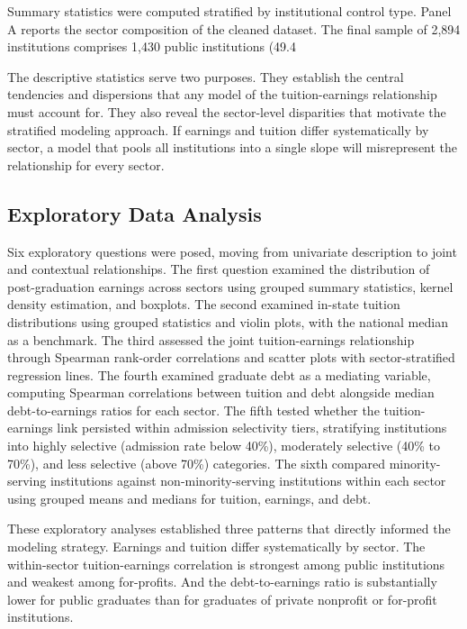 Summary statistics were computed stratified by institutional control type. Panel A reports the sector composition of the cleaned dataset. The final sample of 2,894 institutions comprises 1,430 public institutions (49.4%

The descriptive statistics serve two purposes. They establish the central tendencies and dispersions that any model of the tuition-earnings relationship must account for. They also reveal the sector-level disparities that motivate the stratified modeling approach. If earnings and tuition differ systematically by sector, a model that pools all institutions into a single slope will misrepresent the relationship for every sector.

\subsection{Exploratory Data Analysis}

Six exploratory questions were posed, moving from univariate description to joint and contextual relationships. The first question examined the distribution of post-graduation earnings across sectors using grouped summary statistics, kernel density estimation, and boxplots. The second examined in-state tuition distributions using grouped statistics and violin plots, with the national median as a benchmark. The third assessed the joint tuition-earnings relationship through Spearman rank-order correlations and scatter plots with sector-stratified regression lines. The fourth examined graduate debt as a mediating variable, computing Spearman correlations between tuition and debt alongside median debt-to-earnings ratios for each sector. The fifth tested whether the tuition-earnings link persisted within admission selectivity tiers, stratifying institutions into highly selective (admission rate below 40\%), moderately selective (40\% to 70\%), and less selective (above 70\%) categories. The sixth compared minority-serving institutions against non-minority-serving institutions within each sector using grouped means and medians for tuition, earnings, and debt.

These exploratory analyses established three patterns that directly informed the modeling strategy. Earnings and tuition differ systematically by sector. The within-sector tuition-earnings correlation is strongest among public institutions and weakest among for-profits. And the debt-to-earnings ratio is substantially lower for public graduates than for graduates of private nonprofit or for-profit institutions.

